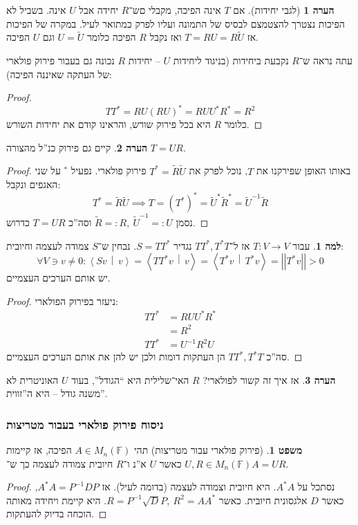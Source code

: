 \documentclass[a4paper]{article}
\newcommand\ra    {\rangle}
\newcommand\la    {\langle}
\newcommand\F         {\mathbb{F}}
\newcommand\co        {\colon}
\newcommand\norm[1]   {\left \vert \left \vert #1 \right \vert \right \vert}
\newcommand\mut [2]   {\left \la #1 \,\middle\vert\, #2 \right \ra}
\newcommand\tl    {\tilde}
\newcommand\op    {^{-1}}
\theoremstyle{definition}
\newtheorem{Theorem}{\color{myblue}משפט}
\newtheorem{Lemma}{\color{myyellow}למה}
\newtheorem{Remark}{\color{mycyan}הערה}
\newcommand\theo  [1] {\begin{Theorem}#1\end{Theorem}}
\newcommand\rmark [1] {\begin{Remark}#1\end{Remark}}
\newcommand\lem   [1] {\begin{Lemma}#1\end{Lemma}}
\begin{document}
	\begin{Remark}[לגבי יחידות]
		אם $T$ אינה הפיכה, מקבלי םש־$R$ יחידה אבל $U$ אינה. בשביל לא הפיכות נצטרך להצטמצם לבסיס של התמונה ועליו לפרק כמתואר לעיל. במקרה של הפיכות אז $T = RU = R \tl U$ ואז נקבל $R$ הפיכה כלומר $U = \tl U$ וגם $U$ הפיכה. 
	\end{Remark}
	
	עתה נראה ש־$R$ נקבעת ביחידות (בניגוד ליחידות $U$ – יחידות $R$ נכונה גם בעבור פירוק פולארי של העתקה שאיננה הפיכה): 
	\begin{proof}
		\[ TT^* = RU(RU)^* = RUU^*R^* = R^2 \]
		כלומר $R$ היא בכל פירוק שורש, והראינו קודם את יחידות השורש. 
	\end{proof}
	\rmark{קיים גם פירוק כנ''ל מהצורה $T = UR$. }
	\begin{proof}
		באותו האופן שפירקנו את $T$, נוכל לפרק את $T^* = \tl R \tl U$ פירוק פולארי. נפעיל $^*$ על שני האגפים ונקבל: 
		\[ T^* =\tl R \tl U \implies T = (T^*)^* = \tl U^*\tl R^* = \tl U\op \tl R \]
		נסמן $\tl R =: R, \ \tl U\op =: U$ וסה''כ $T = UR$ כדרוש. 
	\end{proof}
	\lem{עבור $T \co V \to V$ אז ל־$TT^*, T^*T$
		נגדיר $S = TT^*$. נבחין ש־$S$ צמודה לעצמה וחיובית: 
		\[ \forall V \ni v \neq 0 \co \mut{Sv}{v} = \mut{TT^* v}{v} = \mut{T^* v}{T^*v} = \norm{T^*v} > 0 \] יש אותם הערכים העצמיים. }
	\begin{proof}ניעזר בפירוק הפולארי: 
		\begin{align*}
			TT^* &= RUU^*R^* \\
			&= R^2 \\
			TT^* &= U\op R^2U
		\end{align*}
		סה''כ $TT^*, T^*T$ הן העתקות דומות ולכן יש להן את אותם הערכים העצמיים. 
	\end{proof}
	
	\rmark{אז איך זה קשור לפולארי? $R$ האי־שלילית היא ``הגודל'', בעוד $U$ האוניטרית לא משנה גודל – היא ה''זווית''. }
	
	
	\subsubsection{ניסוח פירוק פולארי בעבור מטריצות}
	\theo{(פירוק פולארי עבור מטריצות) תהי $A \in M_n(\F)$ הפיכה, אז קיימות $U, R \in M_n(\F)$ כאשר $U$ א''נ ו־$R$ חיובית צמודה לעצמה כך ש־$A = UR$. }\begin{proof}
		נסתכל על $A^*A$. היא חיובית וצמודה לעצמה (בדומה לעיל). אז $A^*A = P\op D P$, כאשר $D$ אלגסונית חיובית. כאשר $R = P\op \sqrt D P, \ R^2 = AA^*$. היא קיימת ויחידה מאותה הוכחה בדיוק להעתקות. 
	\end{proof}
	
\end{document}
